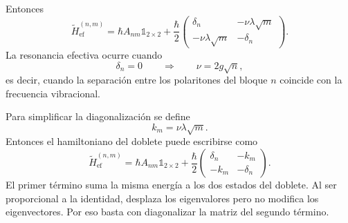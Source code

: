 \documentclass[11pt]{article}
\begin{document}
Entonces
\begin{equation}
  \boxed{
  \tilde H_{\mathrm{ef}}^{(n,m)}
  =
  \hbar A_{nm}\mathds{1}_{2\times2}
  +
  \frac{\hbar}{2}
  \begin{pmatrix}
  \delta_n & -\nu\lambda\sqrt m\\
  -\nu\lambda\sqrt m & -\delta_n
  \end{pmatrix}.
  }
\end{equation}
La resonancia efectiva ocurre cuando
\begin{equation}
  \delta_n=0
  \qquad\Rightarrow\qquad
  \nu=2g\sqrt n,
\end{equation}
es decir, cuando la separaci\'on entre los polaritones del bloque $n$ coincide
con la frecuencia vibracional.

Para simplificar la diagonalizaci\'on se define
\begin{equation}
  k_m=\nu\lambda\sqrt m.
\end{equation}
Entonces el hamiltoniano del doblete puede escribirse como
\begin{equation}
  \tilde H_{\mathrm{ef}}^{(n,m)}
  =
  \hbar A_{nm}\mathds{1}_{2\times2}
  +
  \frac{\hbar}{2}
  \begin{pmatrix}
  \delta_n & -k_m\\
  -k_m & -\delta_n
  \end{pmatrix}.
\end{equation}
El primer t\'ermino suma la misma energ\'ia a los dos estados del doblete. Al
ser proporcional a la identidad, desplaza los eigenvalores pero no modifica los
eigenvectores. Por eso basta con diagonalizar la matriz del segundo t\'ermino.
\end{document}
